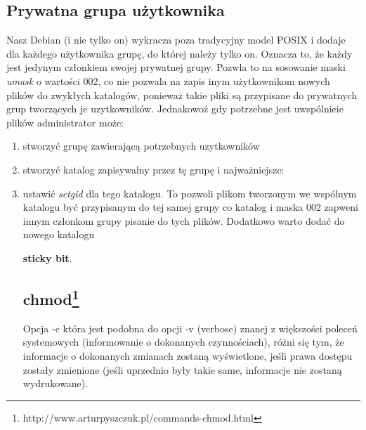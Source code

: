 \documentclass[a4paper,titlepage,12pt]{mwart}
\begin{document}
\begin{enumerate}
\subsection{Prywatna grupa użytkownika}
Nasz Debian (i nie tylko on) wykracza poza tradycyjny model POSIX i dodaje dla każdego użytkownika grupę, do której należy tylko on. Oznacza to, że każdy jest jedynym członkiem swojej prywatnej grupy. Pozwla to na sosowanie maski \textit{umask} o wartości 002, co nie pozwala na zapis inym użytkownikom nowych plików do zwykłych katalogów, ponieważ takie pliki są przypisane do prywatnych grup tworzących je uzytkowników. Jednakowoż gdy potrzebne jest uwspólnieie plików administrator może: \begin{enumerate} \item{stworzyć grupę zawierającą potrzebnych uzytkowników} \item{stworzyć katalog zapisywalny przez tę grupę} i najważniejsze: \item{ustawić \textit{setgid} dla tego katalogu}. To pozwoli plikom tworzonym we wspólnym katalogu być przypisanym do tej samej grupy co katalog i maska 002 zapweni innym członkom grupy pisanie do tych plików. Dodatkowo warto dodać do nowego katalogu {\textbf{sticky bit}.
\subsection{chmod\footnote{http://www.arturpyszczuk.pl/commands-chmod.html}}
Opcja -c która jest podobna do opcji -v (verbose) znanej z większości poleceń systemowych (informowanie o dokonanych czynnościach), różni się tym, że informacje o dokonanych zmianach zostaną wyświetlone, jeśli prawa dostępu zostały zmienione (jeśli uprzednio były takie same, informacje nie zostaną wydrukowane).
}
\end{enumerate}
\end{enumerate}
\end{document}
